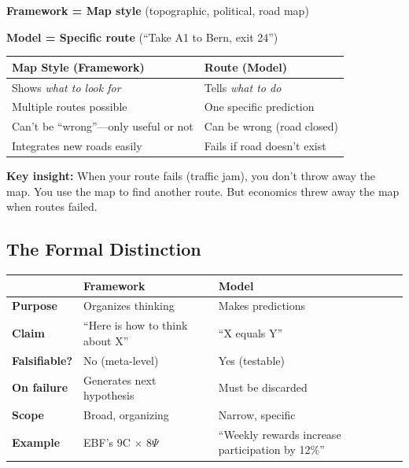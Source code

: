\begin{tcolorbox}[colback=green!5!white, colframe=green!75!black,
    title=\textbf{The Map Analogy}]

\textbf{Framework = Map style} (topographic, political, road map)

\textbf{Model = Specific route} (``Take A1 to Bern, exit 24'')

\vspace{0.5em}
\begin{tabular}{@{}p{6cm}p{6cm}@{}}
\textbf{Map Style (Framework)} & \textbf{Route (Model)} \\
\midrule
Shows \textit{what to look for} & Tells \textit{what to do} \\
Multiple routes possible & One specific prediction \\
Can't be ``wrong''---only useful or not & Can be wrong (road closed) \\
Integrates new roads easily & Fails if road doesn't exist \\
\end{tabular}

\vspace{0.5em}
\textbf{Key insight:} When your route fails (traffic jam), you don't throw away the map.
You use the map to find another route. But economics threw away the map when routes failed.

\end{tcolorbox}

\subsection{The Formal Distinction}

\begin{center}
\renewcommand{\arraystretch}{1.4}
\begin{tabular}{@{}p{3cm}p{5.5cm}p{5.5cm}@{}}
\toprule
& \textbf{Framework} & \textbf{Model} \\
\midrule
\textbf{Purpose} & Organizes thinking & Makes predictions \\
\textbf{Claim} & ``Here is how to think about X'' & ``X equals Y'' \\
\textbf{Falsifiable?} & No (meta-level) & Yes (testable) \\
\textbf{On failure} & Generates next hypothesis & Must be discarded \\
\textbf{Scope} & Broad, organizing & Narrow, specific \\
\textbf{Example} & EBF's 9C $\times$ 8$\Psi$ & ``Weekly rewards increase participation by 12\%'' \\
\bottomrule
\end{tabular}
\end{center}

